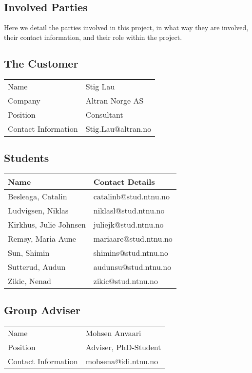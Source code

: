 ﻿\documentclass[../document.tex]{subfiles}
\begin{document}
\subsection*{Involved Parties}
Here we detail the parties involved in this project, in what way they are involved, their contact information, and their role within the project.

\subsection*{The Customer}
\begin{tabular}{ll}
\hline
Name					&	Stig Lau\\
Company				&	Altran Norge AS\\
Position				&	Consultant\\
Contact Information		&	Stig.Lau@altran.no\\
\hline
\end{tabular}

\subsection*{Students}
\begin{tabular}{ll}
\hline
Name				&	Contact Details\\ \hline
Besleaga, Catalin		&	catalinb@stud.ntnu.no\\
Ludvigsen, Niklas		&	niklasl@stud.ntnu.no\\
Kirkhus, Julie Johnsen	&	juliejk@stud.ntnu.no\\
Remøy, Maria Aune		&	mariaare@stud.ntnu.no\\
Sun, Shimin			&	shimins@stud.ntnu.no\\
Sutterud, Audun		&	audunsu@stud.ntnu.no\\
Zikic, Nenad			&	zikic@stud.ntnu.no\\
\hline
\end{tabular}

\subsection*{Group Adviser}
\begin{tabular}{ll}
\hline
Name				&	Mohsen Anvaari\\
Position			&	Adviser, PhD-Student\\
Contact Information	&	mohsena@idi.ntnu.no\\
\hline
\end{tabular}
\end{document}
